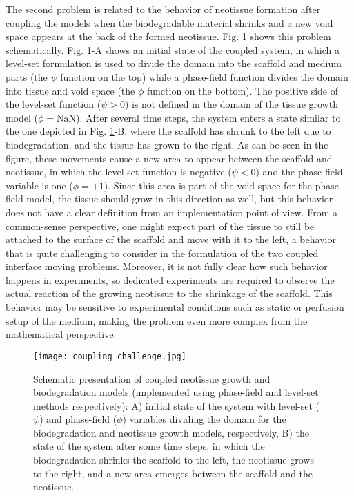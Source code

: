The second problem is related to the behavior of neotissue formation after coupling the models when the biodegradable material shrinks and a new void space appears at the back of the formed neotissue. Fig. \ref{fig:tissue_coupling_challenge} shows this problem schematically. Fig. \ref{fig:tissue_coupling_challenge}-A shows an initial state of the coupled system, in which a level-set formulation is used to divide the domain into the scaffold and medium parts (the $\psi$ function on the top) while a phase-field function divides the domain into tissue and void space (the $\phi$ function on the bottom). The positive side of the level-set function ($\psi > 0$) is not defined in the domain of the tissue growth model ($\phi=\text{NaN}$). After several time steps, the system enters a state similar to the one depicted in Fig. \ref{fig:tissue_coupling_challenge}-B, where the scaffold has shrunk to the left due to biodegradation, and the tissue has grown to the right. As can be seen in the figure, these movements cause a new area to appear between the scaffold and neotissue, in which the level-set function is negative ($\psi < 0$) and the phase-field variable is one ($\phi=+1$). Since this area is part of the void space for the phase-field model, the tissue should grow in this direction as well, but this behavior does not have a clear definition from an implementation point of view. From a common-sense perspective, one might expect part of the tissue to still be attached to the surface of the scaffold and move with it to the left, a behavior that is quite challenging to consider in the formulation of the two coupled interface moving problems. Moreover, it is not fully clear how such behavior happens in experiments, so dedicated experiments are required to observe the actual reaction of the growing neotissue to the shrinkage of the scaffold. This behavior may be sensitive to experimental conditions such as static or perfusion setup of the medium, making the problem even more complex from the mathematical perspective.


\begin{figure}
\centering
\medskip
\texttt{[image: coupling\_challenge.jpg]}
\caption[Schematic presentation of coupled neotissue growth and biodegradation models]{Schematic presentation of coupled neotissue growth and biodegradation models (implemented using phase-field and level-set methods respectively): A) initial state of the system with level-set ($\psi$) and phase-field ($\phi$) variables dividing the domain for the biodegradation and neotissue growth models, respectively, B) the state of the system after some time steps, in which the biodegradation shrinks the scaffold to the left, the neotissue grows to the right, and a new area emerges between the scaffold and the neotissue.}
\label{fig:tissue_coupling_challenge}
\end{figure}

